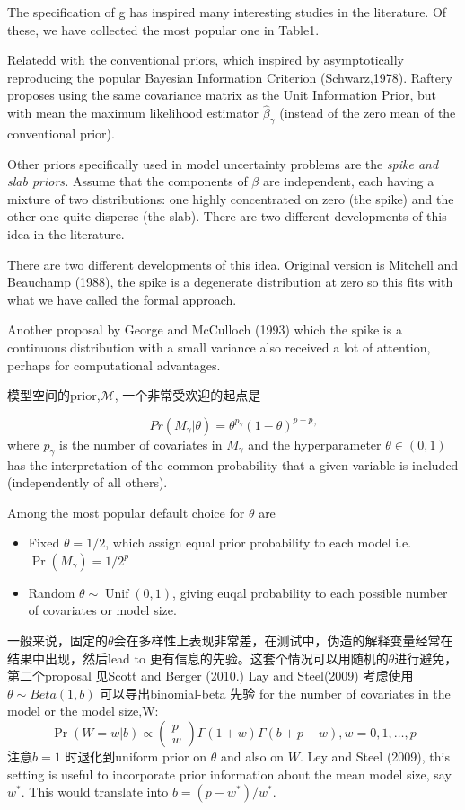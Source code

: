 \documentclass[
]{book}
\theoremstyle{definition}
\theoremstyle{definition}
\theoremstyle{definition}
\theoremstyle{remark}
\begin{document}
The specification of g has inspired many interesting studies in the literature. Of these, we have collected the most popular one in Table1.

Relatedd with the conventional priors, which inspired by asymptotically reproducing the popular Bayesian Information Criterion (Schwarz,1978). Raftery proposes using the same covariance matrix as the Unit Information Prior, but with mean the maximum likelihood estimator \(\hat\beta_\gamma\) (instead of the zero mean of the conventional prior).

Other priors specifically used in model uncertainty problems are the \emph{spike and slab priors.}
Assume that the components of \(\beta\) are independent, each having a mixture of two distributions: one highly concentrated on zero (the spike) and the other one quite disperse (the slab). There are two different developments of this idea in the literature.

There are two different developments of this idea. Original version is Mitchell and Beauchamp (1988), the spike is a degenerate distribution at zero so this fits with what we have called the formal approach.

Another proposal by George and McCulloch (1993) which the spike is a continuous distribution with a small variance also received a lot of attention, perhaps for computational advantages.

模型空间的prior,\(\mathcal M\), 一个非常受欢迎的起点是

\[
Pr(M_\gamma|\theta)=\theta^{p_\gamma}(1-\theta)^{p-p_\gamma}
\]
where \(p_\gamma\) is the number of covariates in \(M_\gamma\) and the hyperparameter \(\theta\in(0,1)\) has the interpretation of the common probability that a given variable is included (independently of all others).

Among the most popular default choice for \(\theta\) are

\begin{itemize}
\item
  Fixed \(\theta=1/2\), which assign equal prior probability to each model i.e.~\(\operatorname{Pr}\left(M_{\gamma}\right)=1 / 2^{p}\)
\item
  Random \(\theta \sim \operatorname{Unif}(0,1)\), giving euqal probability to each possible number of covariates or model size.
\end{itemize}

一般来说，固定的\(\theta\)会在多样性上表现非常差，在测试中，伪造的解释变量经常在结果中出现，然后lead to 更有信息的先验。这套个情况可以用随机的\(\theta\)进行避免，第二个proposal 见Scott and Berger (2010.) Lay and Steel(2009) 考虑使用\(\theta\sim Beta(1,b)\) 可以导出binomial-beta 先验 for the number of covariates in the model or the model size,W:
\[
\operatorname{Pr}(W=w | b) \propto \left( \begin{array}{c}{p} \\ {w}\end{array}\right) \Gamma(1+w) \Gamma(b+p-w), w=0,1, \ldots, p
\]
注意\(b=1\) 时退化到uniform prior on \(\theta\) and also on \(W\). Ley and Steel (2009), this setting is useful to incorporate prior information about the mean model size, say \(w^*\). This would translate into \(b=(p-w^*)/w^*\).
\end{document}
